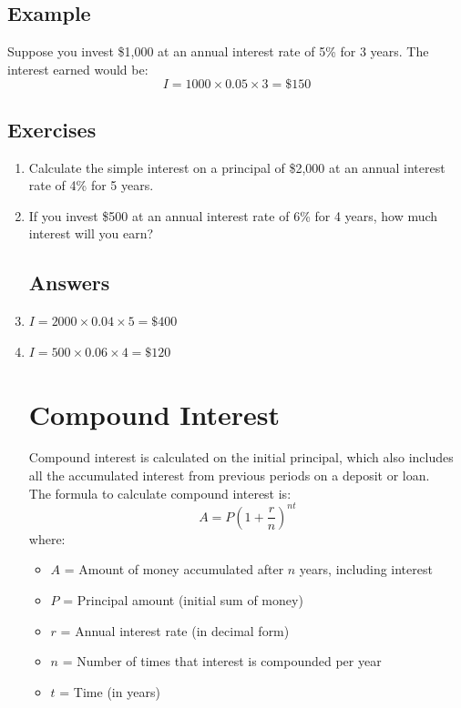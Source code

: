 \documentclass[12pt]{article}
\begin{document}
\subsection*{Example}
Suppose you invest \$1,000 at an annual interest rate of 5\% for 3 years. The interest earned would be:
\[
I = 1000 \times 0.05 \times 3 = \$150
\]

\subsection*{Exercises}

\begin{enumerate}
\item Calculate the simple interest on a principal of \$2,000 at an annual interest rate of 4\% for 5 years.
\item If you invest \$500 at an annual interest rate of 6\% for 4 years, how much interest will you earn?

\subsection*{Answers}

\setcounter{enumi}{0}
\item \(I = 2000 \times 0.04 \times 5 = \$400\)\\
\item \(I = 500 \times 0.06 \times 4 = \$120\)

\newpage

\section*{Compound Interest}

Compound interest is calculated on the initial principal, which also includes all the accumulated interest from previous periods on a deposit or loan.\\

The formula to calculate compound interest is:
\[
A = P \left(1 + \frac{r}{n}\right)^{nt}
\]
where:
\begin{itemize}
    \item \(A\) = Amount of money accumulated after \(n\) years, including interest
    \item \(P\) = Principal amount (initial sum of money)
    \item \(r\) = Annual interest rate (in decimal form)
    \item \(n\) = Number of times that interest is compounded per year
    \item \(t\) = Time (in years)
\end{itemize}\\


\end{enumerate}
\end{document}

